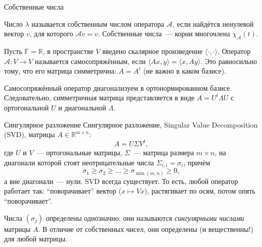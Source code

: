 \documentclass[12pt,handout]{beamer}
\renewcommand\ge{\geqslant}
\newcommand\R{\mathbb R}
\begin{document}
\begin{frame}{Собственные числа}

    Число $\lambda$ называется собственным числом оператора $\mathcal A$, если
    найдётся ненулевой вектор $v$, для которого $\mathcal Av=v$. Собственные
    числа~--- корни многочлена $\chi_{\mathcal A}(t)$.
    \vspace{5pt}

    Пусть $\mathbb{F}=\R$, в пространстве $V$ введено скалярное
    произведение $\langle \cdot,\cdot\rangle$. Оператор $\mathcal A\colon V\to
    V$ называется самосопряжённым, если $\langle Ax,y\rangle = \langle
    x,Ay\rangle$. Это равносильно тому, что его матрица симметрична: $A=A^t$ (не
    важно в каком базисе).
    \vspace{5pt}

    Самосопряжённый оператор диагонализуем в ортонормированном базисе.
    Следовательно, симметричная матрица представляется в виде $A=U^t\Lambda U$ с
    ортогональной $U$ и диагональной $\Lambda$.

\end{frame}


\begin{frame}{Сингулярное разложение}
    Сингулярное разложение, Singular Value Decomposition (SVD), матрицы
    $A\in\mathbb{R}^{m\times n}$:
    $$
    A = U\Sigma V^t,
    $$
    где $U$ и $V$~--- ортогональные матрицы, $\Sigma$~--- матрица размера
    $m\times n$, на диагонали которой стоят неотрицательные числа
    $\Sigma_{i,i}=\sigma_i$, причём
    $$
    \sigma_1\ge\sigma_2\ge\ldots\ge\sigma_{\min(m,n)}\ge 0,
    $$
    а вне диагонали~--- нули. SVD всегда существует. То есть, любой оператор работает так:
    ``поворачивает'' вектор ($x\mapsto Vx$), растягивает по осям, потом опять
    ``поворачивает''.
    
    Числа $(\sigma_j)$ определены однозначно; они называются \textit{сингулярными
    числами} матрицы $A$. В отличие от собственных чисел, они определены (и
    вещественны!) для любой матрицы.

\end{frame}
\end{document}
